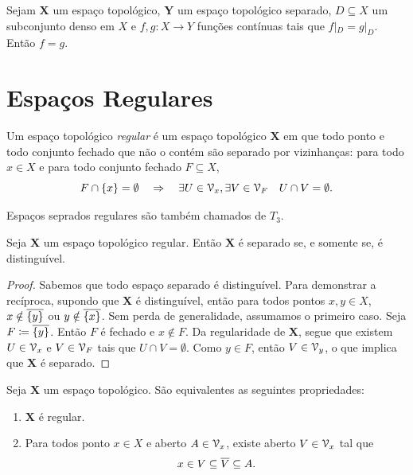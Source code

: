 \begin{prop}
	Sejam $\bm X$ um espaço topológico, $\bm Y$ um espaço topológico separado, $D \subseteq X$ um subconjunto denso em $X$ e $f,g: X \to Y$ funções contínuas tais que $f|_D=g|_D$. Então $f=g$.
\end{prop}

\section{Espaços Regulares}

\begin{defi}
	Um espaço topológico \emph{regular} é um espaço topológico $\bm X$ em que todo ponto e todo conjunto fechado que não o contém são separado por vizinhanças: para todo $x \in X$ e para todo conjunto fechado $F \subseteq X$,
	\begin{equation*}
	F \cap \{x\}=\emptyset \quad \Rightarrow \quad \exists U \in \mathcal{V}_x, \exists V \in \mathcal{V}_F \quad U \cap V = \emptyset.
	\end{equation*}
\end{defi}

Espaços seprados regulares são também chamados de $T_3$.

\begin{prop}
	Seja $\bm X$ um espaço topológico regular. Então $\bm X$ é separado se, e somente se, é distinguível.
\end{prop}
\begin{proof}
	Sabemos que todo espaço separado é distinguível. Para demonstrar a recíproca, supondo que $\bm X$ é distinguível, então para todos pontos $x,y \in X$, $x \notin \overline{\{y\}}$ ou $y \notin \overline{\{x\}}$. Sem perda de generalidade, assumamos o primeiro caso. Seja $F \coloneqq \overline{\{y\}}$. Então $F$ é fechado e $x \notin F$. Da regularidade de $\bm X$, segue que existem $U \in \mathcal{V}_x$ e $V \in \mathcal{V}_{F}$ tais que $U \cap V = \emptyset$. Como $y \in F$, então $V \in \mathcal{V}_y$, o que implica que $\bm X$ é separado.
\end{proof}

\begin{prop}
	Seja $\bm X$ um espaço topológico. São equivalentes as seguintes propriedades:
	\begin{enumerate}
	\item $\bm X$ é regular.
	\item Para todos ponto $x \in X$ e aberto $A \in \mathcal{V}_x$, existe aberto $V \in \mathcal{V}_x$ tal que
		\begin{equation*}
		x \in V \subseteq \overline{V} \subseteq A.
		\end{equation*}
	\end{enumerate}
\end{prop}

